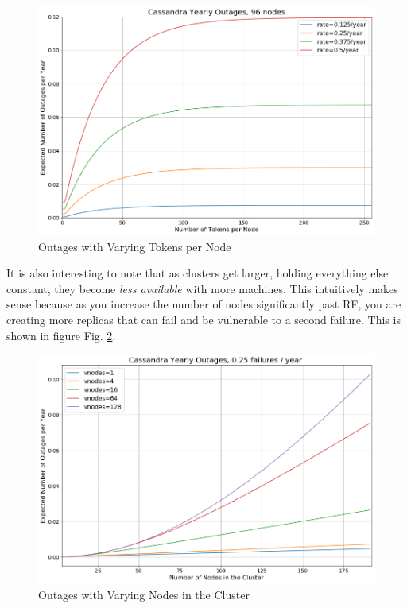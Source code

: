 \documentclass{article}
\begin{document}
\begin{figure}[h!]
    \centering
    \includegraphics[width=1.0\textwidth]{images/outages_all_vnodes.png}
    \caption{Outages with Varying Tokens per Node}
    \label{fig:outages_all_vnodes}
\end{figure}

It is also interesting to note that as clusters get larger, holding everything
else constant, they become \textit{less available} with more machines. This
intuitively makes sense because as you increase the number of nodes
significantly past RF, you are creating more replicas that can fail and be
vulnerable to a second failure. This is shown in figure Fig.
\ref{fig:outages_nodes}.

\begin{figure}[H]
    \centering
    \includegraphics[width=1.0\textwidth]{images/outages_nodes.png}
    \caption{Outages with Varying Nodes in the Cluster}
    \label{fig:outages_nodes}
\end{figure}
\end{document}
